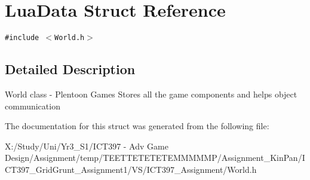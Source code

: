 \hypertarget{struct_lua_data}{
\section{LuaData Struct Reference}
\label{struct_lua_data}
}
{\tt \#include $<$World.h$>$}



\subsection{Detailed Description}
World class - Plentoon Games Stores all the game components and helps object communication 

The documentation for this struct was generated from the following file:\begin{CompactItemize}
\item 
X:/Study/Uni/Yr3\_\-S1/ICT397 - Adv Game Design/Assignment/temp/TEETTETETETEMMMMMP/Assignment\_\-KinPan/ICT397\_\-GridGrunt\_\-Assignment1/VS/ICT397\_\-Assignment/World.h\end{CompactItemize}
